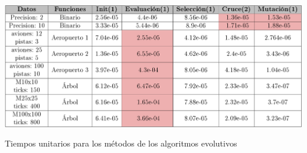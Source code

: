 		
		
		\begin{table}[!h]
			\centering
			\includegraphics[width=1\textwidth]{images/chapter_4/tabla_pev}		
			\caption{Tiempos unitarios para los métodos de los algoritmos evolutivos}
			\label{tab:pev}
		\end{table}
		

		
